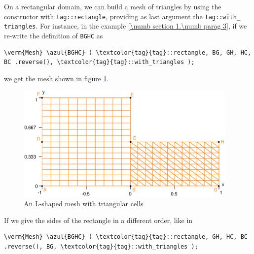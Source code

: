 On a rectangular domain, we can build a mesh of triangles by using the {\small\tt {}}
constructor with {\small\tt \textcolor{tag}{tag}::rectangle}, providing as last argument the
{\small\tt \textcolor{tag}{tag}::with\_\,triangles}.
For instance, in the example \ref{\numb section 1.\numb parag 3},
if we re-write the definition of {\small\tt BGHC} as

\begin{Verbatim}[commandchars=\\\{\},formatcom=\small\tt,baselinestretch=0.94]
   \verm{Mesh} \azul{BGHC} ( \textcolor{tag}{tag}::rectangle, BG, GH, HC, BC .reverse(), \textcolor{tag}{tag}::with_triangles );
\end{Verbatim}

\noindent we get the mesh shown in figure \ref{\numb section 2.\numb fig 3}.

\begin{figure}[ht] \centering
  \includegraphics[width=108mm]{L-shaped-tri}
  \caption{An L-shaped mesh with triangular cells}
  \label{\numb section 2.\numb fig 3}
\end{figure}

If we give the sides of the rectangle in a different order, like in

\begin{Verbatim}[commandchars=\\\{\},formatcom=\small\tt,baselinestretch=0.94]
   \verm{Mesh} \azul{BGHC} ( \textcolor{tag}{tag}::rectangle, GH, HC, BC .reverse(), BG, \textcolor{tag}{tag}::with_triangles );
\end{Verbatim}

